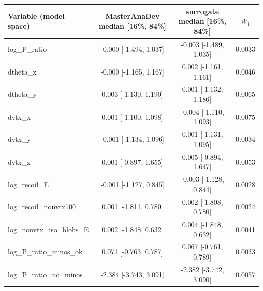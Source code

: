 \begin{tabular}{lccc}
\toprule
Variable (model space) & MasterAnaDev median [16\%, 84\%] & surrogate median [16\%, 84\%] & $W_1$ \\
\midrule
log\_P\_ratio & -0.000 [-1.494, 1.037] & -0.003 [-1.489, 1.035] & 0.0033 \\
dtheta\_x & -0.000 [-1.165, 1.167] & 0.002 [-1.161, 1.161] & 0.0046 \\
dtheta\_y & 0.003 [-1.130, 1.190] & 0.001 [-1.132, 1.186] & 0.0065 \\
dvtx\_x & 0.001 [-1.100, 1.098] & -0.004 [-1.110, 1.093] & 0.0075 \\
dvtx\_y & -0.001 [-1.134, 1.096] & 0.001 [-1.131, 1.095] & 0.0034 \\
dvtx\_z & 0.001 [-0.897, 1.655] & 0.005 [-0.894, 1.647] & 0.0053 \\
log\_recoil\_E & -0.001 [-1.127, 0.845] & -0.003 [-1.128, 0.844] & 0.0028 \\
log\_recoil\_nonvtx100 & 0.001 [-1.811, 0.780] & 0.002 [-1.808, 0.780] & 0.0024 \\
log\_nonvtx\_iso\_blobs\_E & 0.002 [-1.848, 0.632] & 0.004 [-1.848, 0.632] & 0.0041 \\
log\_P\_ratio\_minos\_ok & 0.071 [-0.763, 0.787] & 0.067 [-0.761, 0.789] & 0.0033 \\
log\_P\_ratio\_no\_minos & -2.384 [-3.743, 3.091] & -2.382 [-3.742, 3.090] & 0.0057 \\
\bottomrule
\end{tabular}
